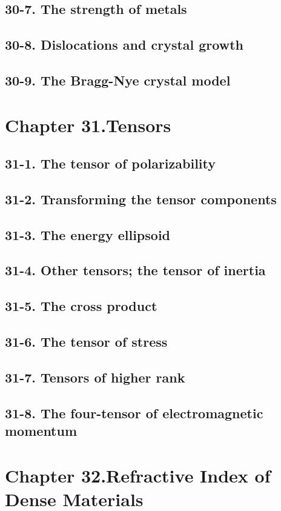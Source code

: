 \documentclass{article}
\begin{document}
\subsection{30-7. The strength of metals}
\subsection{30-8. Dislocations and crystal growth}
\subsection{30-9. The Bragg-Nye crystal model}
\section{Chapter 31.Tensors}
\subsection{31-1. The tensor of polarizability}
\subsection{31-2. Transforming the tensor components}
\subsection{31-3. The energy ellipsoid}
\subsection{31-4. Other tensors; the tensor of inertia}
\subsection{31-5. The cross product}
\subsection{31-6. The tensor of stress}
\subsection{31-7. Tensors of higher rank}
\subsection{31-8. The four-tensor of electromagnetic momentum}
\section{Chapter 32.Refractive Index of Dense Materials}
\end{document}
